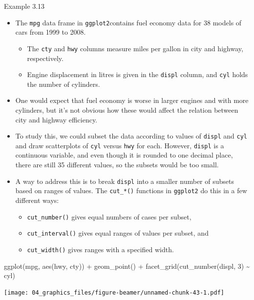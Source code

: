 \documentclass[
  9pt,
  a4paper,
  ignorenonframetext,
  notheorems]{beamer}
\newenvironment{Shaded}{\begin{snugshade}}{\end{snugshade}}
\newcommand{\DecValTok}[1]{\textcolor[rgb]{0.68,0.00,0.00}{#1}}
\newcommand{\FunctionTok}[1]{\textcolor[rgb]{0.28,0.35,0.67}{#1}}
\newcommand{\NormalTok}[1]{\textcolor[rgb]{0.00,0.23,0.31}{#1}}
\newcommand{\SpecialCharTok}[1]{\textcolor[rgb]{0.37,0.37,0.37}{#1}}
\providecommand{\tightlist}{%
  \setlength{\itemsep}{0pt}\setlength{\parskip}{0pt}}\usepackage{longtable,booktabs,array}
\begin{document}
\begin{frame}[fragile]
\begin{block}{Example 3.13}
\protect\hypertarget{example-3.13}{}
\begin{itemize}
\item
  The \texttt{mpg} data frame in \texttt{ggplot2}contains fuel economy
  data for 38 models of cars from 1999 to 2008.

  \begin{itemize}
  \tightlist
  \item
    The \texttt{cty} and \texttt{hwy} columns measure miles per gallon
    in city and highway, respectively.
  \item
    Engine displacement in litres is given in the \texttt{displ} column,
    and \texttt{cyl} holds the number of cylinders.
  \end{itemize}
\item
  One would expect that fuel economy is worse in larger engines and with
  more cylinders, but it's not obvious how these would affect the
  relation between city and highway efficiency.
\item
  To study this, we could subset the data according to values of
  \texttt{displ} and \texttt{cyl} and draw scatterplots of \texttt{cyl}
  versus \texttt{hwy} for each. However, \texttt{displ} is a continuous
  variable, and even though it is rounded to one decimal place, there
  are still 35 different values, so the subsets would be too small.
\item
  A way to address this is to break \texttt{displ} into a smaller number
  of subsets based on ranges of values. The \texttt{cut\_*()} functions
  in \texttt{ggplot2} do this in a few different ways:

  \begin{itemize}
  \tightlist
  \item
    \texttt{cut\_number()} gives equal numbers of cases per subset,
  \item
    \texttt{cut\_interval()} gives equal ranges of values per subset,
    and
  \item
    \texttt{cut\_width()} gives ranges with a specified width.
  \end{itemize}
\end{itemize}
\end{block}
\end{frame}

\begin{frame}[fragile]
\begin{Shaded}
\begin{Highlighting}[]
\FunctionTok{ggplot}\NormalTok{(mpg, }\FunctionTok{aes}\NormalTok{(hwy, cty)) }\SpecialCharTok{+} 
  \FunctionTok{geom\_point}\NormalTok{() }\SpecialCharTok{+} 
  \FunctionTok{facet\_grid}\NormalTok{(}\FunctionTok{cut\_number}\NormalTok{(displ, }\DecValTok{3}\NormalTok{) }\SpecialCharTok{\textasciitilde{}}\NormalTok{ cyl)}
\end{Highlighting}
\end{Shaded}

\texttt{[image: 04\_graphics\_files/figure-beamer/unnamed-chunk-43-1.pdf]}
\end{frame}
\end{document}
